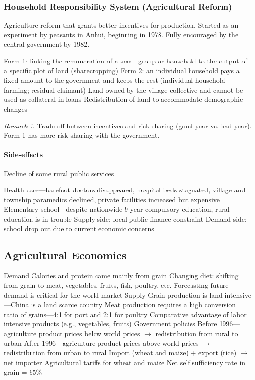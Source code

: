 \documentclass[11pt]{article}
\theoremstyle{definition}
\theoremstyle{remark}
\newtheorem*{remark}{Remark}
\begin{document}
\subsubsection{Household Responsibility System (Agricultural Reform)}
Agriculture reform that grants better incentives for production. Started as an experiment by peasants in Anhui, beginning in 1978. Fully encouraged by the central government by 1982.
\begin{outline}[enumerate]
\1 Form 1: linking the remuneration of a small group or household to the output of a specific plot of land (sharecropping)
\1 Form 2: an individual household pays a fixed amount to the government and keeps the rest (individual household farming; residual claimant)
\1 Land owned by the village collective and cannot be used as collateral in loans
\1 Redistribution of land to accommodate demographic changes
\end{outline}

\begin{remark}
Trade-off between incentives and risk sharing (good year vs. bad year). Form 1 has more risk sharing with the government.
\end{remark}

\paragraph{Side-effects}
Decline of some rural public services
\begin{outline}[enumerate]
\1 Health care---barefoot doctors disappeared, hospital beds stagnated, village and township paramedics declined, private facilities increased but expensive
\1 Elementary school---despite nationwide 9 year compulsory education, rural education is in trouble
	\2 Supply side: local public finance constraint
	\2 Demand side: school drop out due to current economic concerns
\end{outline}

\subsection{Agricultural Economics}
\begin{outline}[enumerate]
\1 Demand
	\2 Calories and protein came mainly from grain
	\2 Changing diet: shifting from grain to meat, vegetables, fruits, fish, poultry, etc.
	\2 Forecasting future demand is critical for the world market
\1 Supply
	\2 Grain production is land intensive---China is a land scarce country
	\2 Meat production requires a high conversion ratio of grains---4:1 for port and 2:1 for poultry
	\2 Comparative advantage of labor intensive products (e.g., vegetables, fruits)
\1 Government policies
	\2 Before 1996---agriculture product prices below world prices $\to$ redistribution from rural to urban
	\2 After 1996---agriculture product prices above world prices $\to$ redistribution from urban to rural
\1 Import (wheat and maize) + export (rice) $\to$ net importer
	\2 Agricultural tariffs for wheat and maize
\1 Net self sufficiency rate in grain = 95\%
\end{outline}
\end{document}

